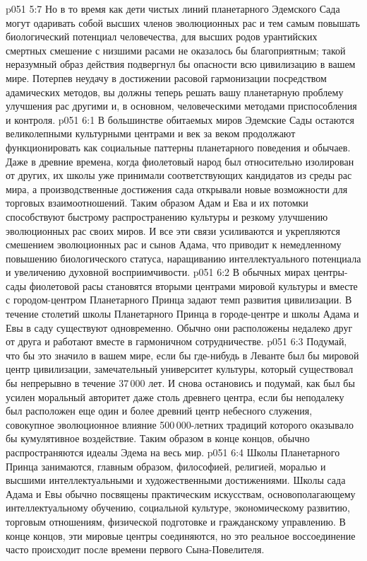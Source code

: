\vs p051 5:7 Но в то время как дети чистых линий планетарного Эдемского Сада могут одаривать собой высших членов эволюционных рас и тем самым повышать биологический потенциал человечества, для высших родов урантийских смертных смешение с низшими расами не оказалось бы благоприятным; такой неразумный образ действия подвергнул бы опасности всю цивилизацию в вашем мире. Потерпев неудачу в достижении расовой гармонизации посредством адамических методов, вы должны теперь решать вашу планетарную проблему улучшения рас другими и, в основном, человеческими методами приспособления и контроля.
\vs p051 6:1 В большинстве обитаемых миров Эдемские Сады остаются великолепными культурными центрами и век за веком продолжают функционировать как социальные паттерны планетарного поведения и обычаев. Даже в древние времена, когда фиолетовый народ был относительно изолирован от других, их школы уже принимали соответствующих кандидатов из среды рас мира, а производственные достижения сада открывали новые возможности для торговых взаимоотношений. Таким образом Адам и Ева и их потомки способствуют быстрому распространению культуры и резкому улучшению эволюционных рас своих миров. И все эти связи усиливаются и укрепляются смешением эволюционных рас и сынов Адама, что приводит к немедленному повышению биологического статуса, наращиванию интеллектуального потенциала и увеличению духовной восприимчивости.
\vs p051 6:2 В обычных мирах центры\hyp{}сады фиолетовой расы становятся вторыми центрами мировой культуры и вместе с городом\hyp{}центром Планетарного Принца задают темп развития цивилизации. В течение столетий школы Планетарного Принца в городе\hyp{}центре и школы Адама и Евы в саду существуют одновременно. Обычно они расположены недалеко друг от друга и работают вместе в гармоничном сотрудничестве.
\vs p051 6:3 Подумай, что бы это значило в вашем мире, если бы где\hyp{}нибудь в Леванте был бы мировой центр цивилизации, замечательный университет культуры, который существовал бы непрерывно в течение 37\,000 лет. И снова остановись и подумай, как был бы усилен моральный авторитет даже столь древнего центра, если бы неподалеку был расположен еще один и более древний центр небесного служения, совокупное эволюционное влияние 500\,000\hyp{}летних традиций которого оказывало бы кумулятивное воздействие. Таким образом в конце концов, обычно распространяются идеалы Эдема на весь мир.
\vs p051 6:4 Школы Планетарного Принца занимаются, главным образом, философией, религией, моралью и высшими интеллектуальными и художественными достижениями. Школы сада Адама и Евы обычно посвящены практическим искусствам, основополагающему интеллектуальному обучению, социальной культуре, экономическому развитию, торговым отношениям, физической подготовке и гражданскому управлению. В конце концов, эти мировые центры соединяются, но это реальное воссоединение часто происходит после времени первого Сына\hyp{}Повелителя.
